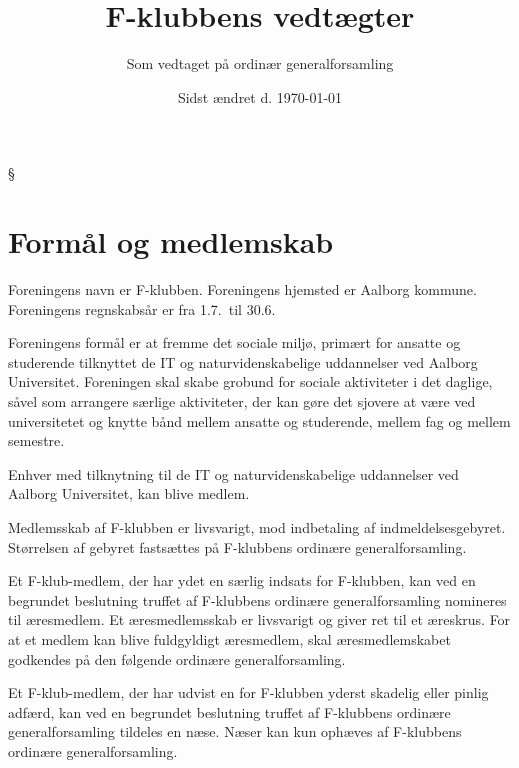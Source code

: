 \documentclass[a4paper,12pt,danish]{article}
\title{\bf F-klubbens vedtægter}
\author{Som vedtaget på ordinær generalforsamling}
\date{Sidst ændret d. \today}
\begin{document}
\maketitle





\begin{list}
{\S {}}{}
\section{Formål og medlemskab}
\item Foreningens navn er F-klubben. Foreningens hjemsted er Aalborg
  kommune. Foreningens regnskabsår er fra 1.7.\ til 30.6.
  
\item Foreningens formål er at fremme det sociale miljø,
  primært for ansatte og studerende tilknyttet de IT og
  naturvidenskabelige uddannelser ved Aalborg Universitet. Foreningen
  skal skabe grobund for sociale aktiviteter i det daglige, såvel
  som arrangere særlige aktiviteter, der kan gøre det sjovere at
  være ved universitetet og knytte bånd mellem ansatte og
  studerende, mellem fag og mellem semestre.

\item Enhver med tilknytning til de IT og naturvidenskabelige uddannelser ved Aalborg Universitet, kan blive medlem.

\item Medlemsskab af F-klubben er livsvarigt, mod indbetaling af indmeldelsesgebyret.
  Størrelsen af gebyret fastsættes på F-klubbens ordinære generalforsamling.
  
\item Et F-klub-medlem, der har ydet en særlig indsats for
  F-klubben, kan ved en begrundet beslutning truffet af F-klubbens
  ordinære generalforsamling nomineres til æresmedlem. Et
  æresmedlemsskab er livsvarigt og giver ret til et æreskrus. For
  at et medlem kan blive fuldgyldigt æresmedlem, skal æresmedlemskabet
	godkendes på den følgende ordinære
  generalforsamling.
  
\item Et F-klub-medlem, der har udvist en for F-klubben yderst
  skadelig eller pinlig adfærd, kan ved en begrundet beslutning
  truffet af F-klubbens ordinære generalforsamling tildeles en
  næse.  Næser kan kun ophæves af F-klubbens ordinære
  generalforsamling.


\end{list}
\end{document}
